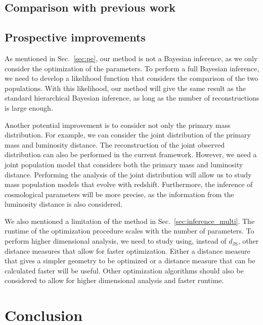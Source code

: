 \documentclass[twocolumn]{aastex631}
\begin{document}
\subsection{Comparison with previous work}
\label{sec:comparison}

\subsection{Prospective improvements}
\label{sec:prospective}
As mentioned in Sec.~\ref{sec:pe}, our method is not a Bayesian inference, as we only consider the optimization of the parameters.
To perform a full Bayesian inference, we need to develop a likelihood function that considers the comparison of the two populations.
With this likelihood, our method will give the same result as the standard hierarchical Bayesian inference, as long as the number of reconstructions is large enough.

Another potential improvement is to consider not only the primary mass distribution.
For example, we can consider the joint distribution of the primary mass and luminosity distance.
The reconstruction of the joint observed distribution can also be performed in the current framework.
However, we need a joint population model that considers both the primary mass and luminosity distance.
Performing the analysis of the joint distribution will allow us to study mass population models that evolve with redshift.
Furthermore, the inference of cosmological parameters will be more precise, as the information from the luminosity distance is also considered.

We also mentioned a limitation of the method in Sec.~\ref{sec:inference_multi}.
The runtime of the optimization procedure scales with the number of parameters.
To perform higher dimensional analysis, we need to study using, instead of $d_\mathrm{JS}$, other distance measures that allow for faster optimization.
Either a distance measure that gives a simpler geometry to be optimized or a distance measure that can be calculated faster will be useful.
Other optimization algorithms should also be considered to allow for higher dimensional analysis and faster runtime.

\section{Conclusion}
\label{sec:conclusion}
\end{document}

